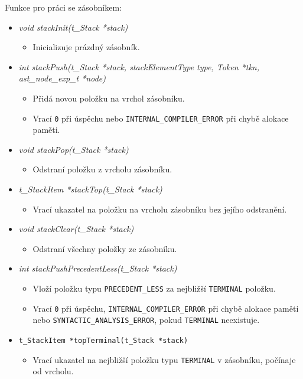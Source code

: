 \documentclass[a4paper, 12pt]{article}
\begin{document}
Funkce pro práci se zásobníkem:

\begin{itemize}
    \item \textit{void stackInit(t\_Stack *stack)}
    \begin{itemize}
        \item Inicializuje prázdný zásobník.
    \end{itemize}

    \item \textit{int stackPush(t\_Stack *stack, stackElementType type, Token *tkn, ast\_node\_exp\_t *node)}
    \begin{itemize}
        \item Přidá novou položku na vrchol zásobníku.
        \item Vrací \texttt{0} při úspěchu nebo \texttt{INTERNAL\_COMPILER\_ERROR} při chybě alokace paměti.
    \end{itemize}

    \item \textit{void stackPop(t\_Stack *stack)}
    \begin{itemize}
        \item Odstraní položku z vrcholu zásobníku.
    \end{itemize}

    \item \textit{t\_StackItem *stackTop(t\_Stack *stack)}
    \begin{itemize}
        \item Vrací ukazatel na položku na vrcholu zásobníku bez jejího odstranění.
    \end{itemize}

    \item \textit{void stackClear(t\_Stack *stack)}
    \begin{itemize}
        \item Odstraní všechny položky ze zásobníku.
    \end{itemize}

    \item \textit{int stackPushPrecedentLess(t\_Stack *stack)}
    \begin{itemize}
        \item Vloží položku typu \texttt{PRECEDENT\_LESS} za nejbližší \texttt{TERMINAL} položku.
        \item Vrací \texttt{0} při úspěchu, \texttt{INTERNAL\_COMPILER\_ERROR} při chybě alokace paměti nebo \texttt{SYNTACTIC\_ANALYSIS\_ERROR}, pokud \texttt{TERMINAL} neexistuje.
    \end{itemize}

    \item \texttt{t\_StackItem *topTerminal(t\_Stack *stack)}
    \begin{itemize}
        \item Vrací ukazatel na nejbližší položku typu \texttt{TERMINAL} v zásobníku, počínaje od vrcholu.
    \end{itemize}
\end{itemize}
\end{document}
